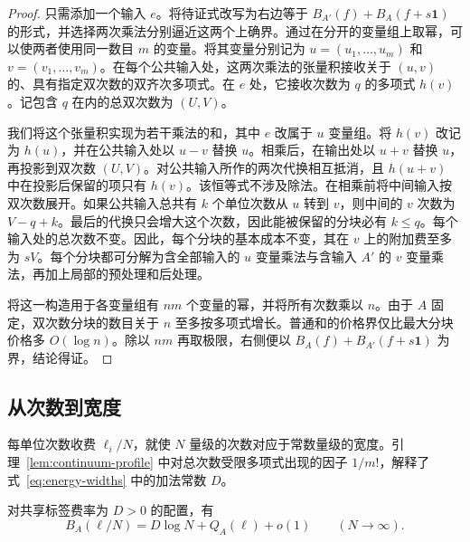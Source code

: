 \begin{proof}
只需添加一个输入 $e$。将待证式改写为右边等于 $B_{A'}(f)+B_A(f+s\mathbf1)$ 的形式，并选择两次乘法分别逼近这两个上确界。通过在分开的变量组上取幂，可以使两者使用同一数目 $m$ 的变量。将其变量分别记为 $u=(u_1,\ldots,u_m)$ 和 $v=(v_1,\ldots,v_m)$。在每个公共输入处，这两次乘法的张量积接收关于 $(u,v)$ 的、具有指定双次数的双齐次多项式。在 $e$ 处，它接收次数为 $q$ 的多项式 $h(v)$。记包含 $q$ 在内的总双次数为 $(U,V)$。

我们将这个张量积实现为若干乘法的和，其中 $e$ 改属于 $u$ 变量组。将 $h(v)$ 改记为 $h(u)$，并在公共输入处以 $u-v$ 替换 $u$。相乘后，在输出处以 $u+v$ 替换 $u$，再投影到双次数 $(U,V)$。对公共输入所作的两次代换相互抵消，且 $h(u+v)$ 中在投影后保留的项只有 $h(v)$。该恒等式不涉及除法。在相乘前将中间输入按双次数展开。如果公共输入总共有 $k$ 个单位次数从 $u$ 转到 $v$，则中间的 $v$ 次数为 $V-q+k$。最后的代换只会增大这个次数，因此能被保留的分块必有 $k\le q$。每个输入处的总次数不变。因此，每个分块的基本成本不变，其在 $v$ 上的附加费至多为 $sV$。每个分块都可分解为含全部输入的 $u$ 变量乘法与含输入 $A'$ 的 $v$ 变量乘法，再加上局部的预处理和后处理。

将这一构造用于各变量组有 $nm$ 个变量的幂，并将所有次数乘以 $n$。由于 $A$ 固定，双次数分块的数目关于 $n$ 至多按多项式增长。普通和的价格界仅比最大分块价格多 $O(\log n)$。除以 $nm$ 再取极限，右侧便以 $B_A(f)+B_{A'}(f+s\mathbf1)$ 为界，结论得证。
\end{proof}

\subsection{从次数到宽度}

每单位次数收费 $\ell_i/N$，就使 $N$ 量级的次数对应于常数量级的宽度。引理~\ref{lem:continuum-profile} 中对总次数受限多项式出现的因子 $1/m!$，解释了式~\eqref{eq:energy-widths} 中的加法常数 $D$。

\begin{lemma}[次数能量的连续极限]\label{lem:continuum-energy}
对共享标签费率为 $D>0$ 的配置，有
\begin{equation}\label{eq:src6}
 B_A(\ell/N)=D\log N+Q_A(\ell)+o(1)
 \qquad(N\longrightarrow\infty).
\end{equation}
\end{lemma}

